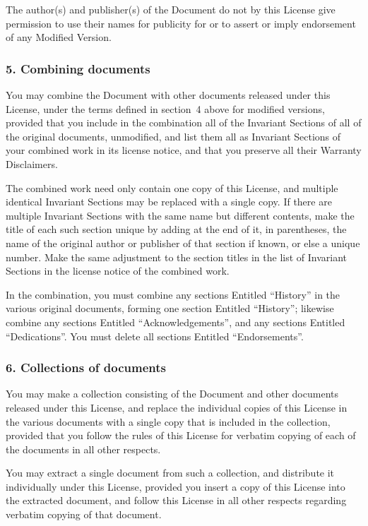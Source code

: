 \documentclass[a4paper,openany]{book}
\begin{document}
\begin{results}
The author(s) and publisher(s) of the Document do not by this License
give permission to use their names for publicity for or to assert or
imply endorsement of any Modified Version.

\subsubsection*{5. Combining documents}

You may combine the Document with other documents released under this
License, under the terms defined in section~4 above for modified
versions, provided that you include in the combination all of the
Invariant Sections of all of the original documents, unmodified, and
list them all as Invariant Sections of your combined work in its
license notice, and that you preserve all their Warranty Disclaimers.

The combined work need only contain one copy of this License, and
multiple identical Invariant Sections may be replaced with a single
copy. If there are multiple Invariant Sections with the same name but
different contents, make the title of each such section unique by
adding at the end of it, in parentheses, the name of the original
author or publisher of that section if known, or else a unique number.
Make the same adjustment to the section titles in the list of
Invariant Sections in the license notice of the combined work.

In the combination, you must combine any sections Entitled ``History''
in the various original documents, forming one section Entitled
``History''; likewise combine any sections Entitled ``Acknowledgements'',
and any sections Entitled ``Dedications''. You must delete all sections
Entitled ``Endorsements''.

\subsubsection*{6. Collections of documents}

You may make a collection consisting of the Document and other documents
released under this License, and replace the individual copies of this
License in the various documents with a single copy that is included in
the collection, provided that you follow the rules of this License for
verbatim copying of each of the documents in all other respects.

You may extract a single document from such a collection, and distribute
it individually under this License, provided you insert a copy of this
License into the extracted document, and follow this License in all
other respects regarding verbatim copying of that document.


\end{results}
\end{document}
